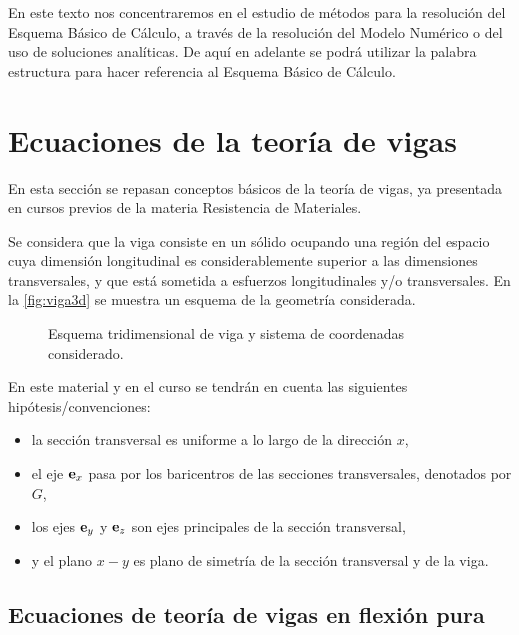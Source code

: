 En este texto nos concentraremos en el estudio de métodos para la resolución del Esquema Básico de Cálculo, a través de la resolución del Modelo Numérico o del uso de soluciones analíticas. %
%
De aquí en adelante se podrá utilizar la palabra estructura para hacer referencia al Esquema Básico de Cálculo.











\section{Ecuaciones de la teoría de vigas} \label{sec:teovigastimo}

En esta sección se repasan conceptos básicos de la teoría de vigas, ya presentada en cursos previos de la materia Resistencia de Materiales. %

Se considera que la viga consiste en un sólido ocupando una región del espacio cuya dimensión longitudinal es considerablemente superior a las dimensiones transversales, y que está sometida a esfuerzos longitudinales y/o transversales. %
%
En la \autoref{fig:viga3d} se muestra un esquema de la geometría considerada. %
%
\begin{figure}[htb]
	\centering
	\def\svgwidth{0.5\textwidth}
	
	\caption{Esquema tridimensional de viga y sistema de coordenadas considerado.}
	\label{fig:viga3d}
\end{figure}

%
En este material y en el curso se tendrán en cuenta las siguientes hipótesis/convenciones:
%
\begin{itemize}
	\item la sección transversal es uniforme a lo largo de la dirección $x$, %
	\item el eje ${\bf e}_x$ pasa por los baricentros de las secciones transversales, denotados por $G$,
	\item los ejes ${\bf e}_y$ y ${\bf e}_z$ son ejes principales de la sección transversal,
	\item y el plano $x-y$ es plano de simetría de la sección transversal y de la viga.
\end{itemize}


\subsection{Ecuaciones de teoría de vigas en flexión pura}

